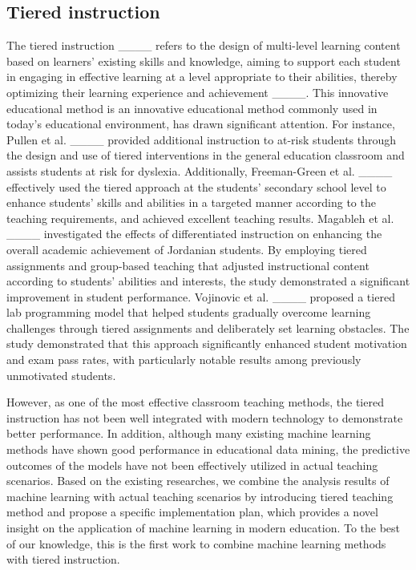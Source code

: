 \subsection{Tiered instruction}
The tiered instruction ____ refers to the design of multi-level learning content based on learners' existing skills and knowledge, aiming to support each student in engaging in effective learning at a level appropriate to their abilities, thereby optimizing their learning experience and achievement ____. This innovative educational method is an innovative educational method commonly used in today's educational environment, has drawn significant attention. For instance, Pullen et al. ____ provided additional instruction to at-risk students through the design and use of tiered interventions in the general education classroom and assists students at risk for dyslexia. Additionally, Freeman-Green et al. ____ effectively used the tiered approach at the students' secondary school level to enhance students' skills and abilities in a targeted manner according to the teaching requirements, and achieved excellent teaching results. Magableh et al. ____ investigated the effects of differentiated instruction on enhancing the overall academic achievement of Jordanian students. By employing tiered assignments and group-based teaching that adjusted instructional content according to students' abilities and interests, the study demonstrated a significant improvement in student performance. Vojinovic et al. ____ proposed a tiered lab programming model that helped students gradually overcome learning challenges through tiered assignments and deliberately set learning obstacles. The study demonstrated that this approach significantly enhanced student motivation and exam pass rates, with particularly notable results among previously unmotivated students. 

However, as one of the most effective classroom teaching methods, the tiered instruction has not been well integrated with modern technology to demonstrate better performance. In addition, although many existing machine learning methods have shown good performance in educational data mining, the predictive outcomes of the models have not been effectively utilized in actual teaching scenarios. Based on the existing researches, we combine the analysis results of machine learning with actual teaching scenarios by introducing tiered teaching method and propose a specific implementation plan, which provides a novel insight on the application of machine learning in modern education. To the best of our knowledge, this is the first work to combine machine learning methods with tiered instruction.